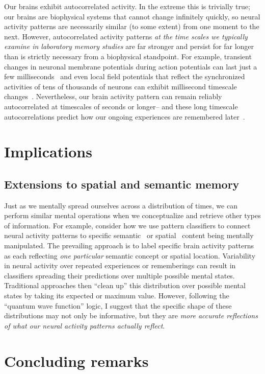 \documentclass{article}
\begin{document}
Our brains exhibit autocorrelated activity.  In the extreme this is trivially true; our brains are biophysical systems that cannot change infinitely quickly, so neural activity patterns are necessarily similar (to some extent) from one moment to the next.  However, autocorrelated activity patterns \textit{at the time scales we typically examine in laboratory memory studies} are far stronger and persist for far longer than is strictly necessary from a biophysical standpoint.  For example, transient changes in neuronal membrane potentials during action potentials can last just a few milliseconds~\citep{HodgHuxl52} and even local field potentials that reflect the synchronized activities of tens of thousands of neurons can exhibit millisecond timescale changes~\citep{Frie05, Buzs06}.  Nevertheless, our brain activity pattern can remain reliably autocorrelated at timescales of seconds or longer-- and these long timescale autocorrelations predict how our ongoing experiences are remembered later~\citep[e.g.][]{MannEtal07, MannEtal11, HowaEtal12, FolkEtal18}.

\section*{Implications}
\subsection*{Extensions to spatial and semantic memory}
Just as we mentally spread ourselves across a distribution of times, we can perform similar mental operations when we conceptualize and retrieve other types of information.  For example, consider how we use pattern classifiers to connect neural activity patterns to specific semantic~\citep{semantic decoding studies} or spatial~\citep{spatial decoding studies} content being mentally manipulated.  The prevailing approach is to label specific brain activity patterns as each reflecting \textit{one particular} semantic concept or spatial location.  Variability in neural activity over repeated experiences or rememberings can result in classifiers spreading their predictions over multiple possible mental states.  Traditional approaches then ``clean up'' this distribution over possible mental states by taking its expected or maximum value.  However, following the ``quantum wave function'' logic, I suggest that the specific shape of these distributions may not only be informative, but they are \textit{more accurate reflections of what our neural activity patterns actually reflect}.

\section*{Concluding remarks}



\end{document}

